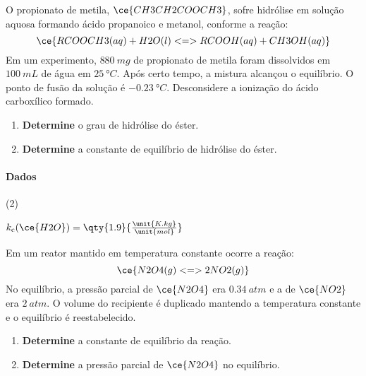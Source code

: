 \begin{problem}[
	id={2F54},
	path={/home/braun/Documents/Developer/braunchem/data/problems/Q2/2F/2F54}
]
O propionato de metila, {\(\ce{CH3CH2COOCH3}\)}, sofre hidrólise em solução aquosa formando ácido propanoico e metanol, conforme a reação: {\[
    \ce{ RCOOCH3(aq) + H2O(l) <=> RCOOH(aq) + CH3OH(aq) }
\]} Em um experimento, {\(\qty{880}{\unit{mg}}\)} de propionato de metila foram dissolvidos em {\(\qty{100}{\unit{mL}}\)} de água em
{\(\qty{25}{\unit{\degree C}}\)}. Após certo tempo, a mistura alcançou o equilíbrio. O ponto de fusão da solução é
{\(\qty{-0,23}{\unit{\degree C}}\)}. Desconsidere a ionização do ácido carboxílico formado.

\begin{enumerate}
\def\labelenumi{\alph{enumi}.}
\tightlist
\item
  \textbf{Determine} o grau de hidrólise do éster.
\item
  \textbf{Determine} a constante de equilíbrio de hidrólise do éster.
\end{enumerate}
\paragraph{Dados}\small 
\begin{datalist}
[start = 1](2)\item $k_\mathrm{c}(\ce{H2O}) = \qty{1.9}{\tfrac{\unit{K.kg}}{\unit{mol}}}$
\end{datalist}

\end{problem}


\begin{problem}[
	id={2F55},
	path={/home/braun/Documents/Developer/braunchem/data/problems/Q2/2F/2F55}
]
Em um reator mantido em temperatura constante ocorre a reação: {\[
    \ce{ N2O4(g) <=> 2 NO2(g) }
\]} No equilíbrio, a pressão parcial de {\(\ce{N2O4}\)} era {\(\qty{0,34}{\unit{atm}}\)} e a de {\(\ce{NO2}\)} era {\(\qty{2}{\unit{atm}}\)}. O volume
do recipiente é duplicado mantendo a temperatura constante e o equilíbrio é reestabelecido.

\begin{enumerate}
\def\labelenumi{\alph{enumi}.}
\tightlist
\item
  \textbf{Determine} a constante de equilíbrio da reação.
\item
  \textbf{Determine} a pressão parcial de {\(\ce{N2O4}\)} no equilíbrio.
\end{enumerate}

\end{problem}


